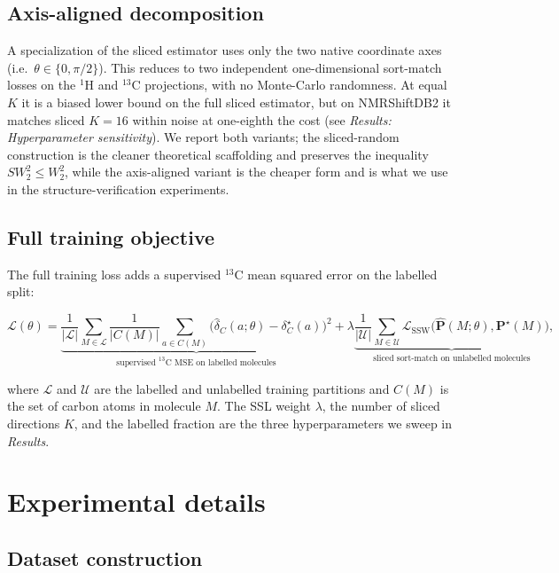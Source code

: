 \documentclass[
  11pt,
  a4paper,
]{article}
\begin{document}
\subsection*{Axis-aligned decomposition}

A specialization of the sliced estimator uses only the two native
coordinate axes (i.e.~\(\theta \in \{0,\pi/2\}\)). This reduces to two
independent one-dimensional sort-match losses on the \(^{1}\)H and
\(^{13}\)C projections, with no Monte-Carlo randomness. At equal \(K\) it
is a biased lower bound on the full sliced estimator, but on
NMRShiftDB2 it matches sliced \(K=16\) within noise at one-eighth the
cost (see \emph{Results: Hyperparameter sensitivity}). We report both
variants; the sliced-random construction is the cleaner theoretical
scaffolding and preserves the inequality
\(SW_{2}^{2} \leq W_{2}^{2}\), while the axis-aligned variant is the
cheaper form and is what we use in the structure-verification
experiments.

\subsection*{Full training objective}

The full training loss adds a supervised \(^{13}\)C mean squared error on
the labelled split:

\[
\mathcal{L}(\theta) =
\underbrace{\frac{1}{|\mathcal{L}|}
  \sum_{M\in\mathcal{L}} \frac{1}{|C(M)|}
  \sum_{a\in C(M)}
  \bigl(\hat{\delta}_{C}(a;\theta) - \delta^{\star}_{C}(a)\bigr)^{2}}%
  _{\text{supervised }^{13}\text{C MSE on labelled molecules}}
+ \lambda
\underbrace{\frac{1}{|\mathcal{U}|}
  \sum_{M\in\mathcal{U}}
  \mathcal{L}_{\mathrm{SSW}}\bigl(\hat{\mathbf{P}}(M;\theta),
                                  \mathbf{P}^{\star}(M)\bigr)}%
  _{\text{sliced sort-match on unlabelled molecules}},
\]

where \(\mathcal{L}\) and \(\mathcal{U}\) are the labelled and unlabelled
training partitions and \(C(M)\) is the set of carbon atoms in molecule
\(M\). The SSL weight \(\lambda\), the number of sliced directions \(K\), and
the labelled fraction are the three hyperparameters we sweep in
\emph{Results}.

\section{Experimental details}\label{experimental-details}

\subsection*{Dataset construction}
\end{document}
